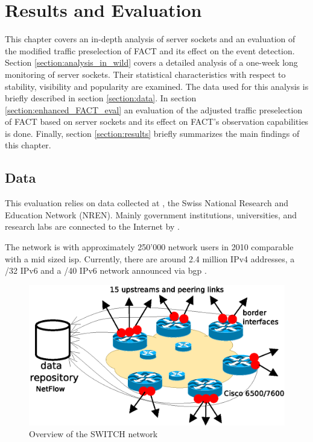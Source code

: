 \chapter{Results and Evaluation \label{chapter:results}}

This chapter covers an in-depth analysis of server sockets and an evaluation of the modified traffic preselection of \gls{FACT} and its effect on the event detection. 
Section \ref{section:analysis_in_wild} covers a detailed analysis of a one-week long monitoring of server sockets. Their statistical characteristics with respect to stability, visibility and popularity are examined. 
The data used for this analysis is briefly described in section \ref{section:data}.
In section \ref{section:enhanced_FACT_eval} an evaluation of the adjusted traffic preselection of \gls{FACT} based on server sockets and its effect on \gls{FACT}'s observation capabilities is done.
Finally, section \ref{section:results} briefly summarizes the main findings of this chapter. 

\section{Data 
\label{section:data}}

This evaluation relies on data collected at \citet{switch}, the Swiss National Research and Education Network (NREN). 
Mainly government institutions, universities, and research labs are connected to the Internet by \citet{switch} \citep{Schatzmann:Mining}.

The \citet{switch} network is with approximately 250'000 network users in 2010 comparable with a mid sized \gls{isp}. Currently, there are around 2.4 million \gls{IPv4} addresses, a /32 IPv6 and a /40 \gls{IPv6} network announced via \gls{bgp} \citep{Schatzmann:Tracing}.
\begin{figure}
	[ht] \centering 
	\includegraphics[width=12cm]{images/network_overview.eps} \caption{Overview of the SWITCH network \citep{SchatzmanThesis2012}} 
	\label{fig:switch_nework} 
\end{figure}

